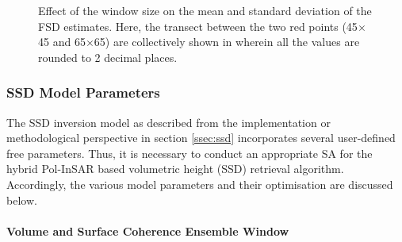 \documentclass[review]{elsarticle}
\numberwithin{equation}{section}
\numberwithin{figure}{section}
\numberwithin{table}{section}
\begin{document}
\begin{figure}[htb]
\begin{subfigure}[t]{0.49\textwidth}
        \caption{}
        \label{subfig:fwindow_var}
    \end{subfigure}
    \begin{subfigure}[t]{0.49\textwidth}
        \caption{}
        \label{subfig:fwindow_transect}
    \end{subfigure}
    \caption{Effect of the window size on the  mean and  standard deviation of the FSD estimates. Here, the transect between the two red points (45$\times$45 and 65$\times$65) are collectively shown in  wherein all the values are rounded to 2 decimal places.}
    \label{fig:fsd_res}
\end{figure}

\subsubsection{SSD Model Parameters}
\label{sssec:ssd_param}

The SSD inversion model as described from the implementation or methodological perspective in section \ref{ssec:ssd} incorporates several user-defined free parameters. Thus, it is necessary to conduct an appropriate SA for the hybrid Pol-InSAR based volumetric height (SSD) retrieval algorithm. Accordingly, the various model parameters and their optimisation are discussed below.

\paragraph*{Volume and Surface Coherence Ensemble Window}
\end{document}
